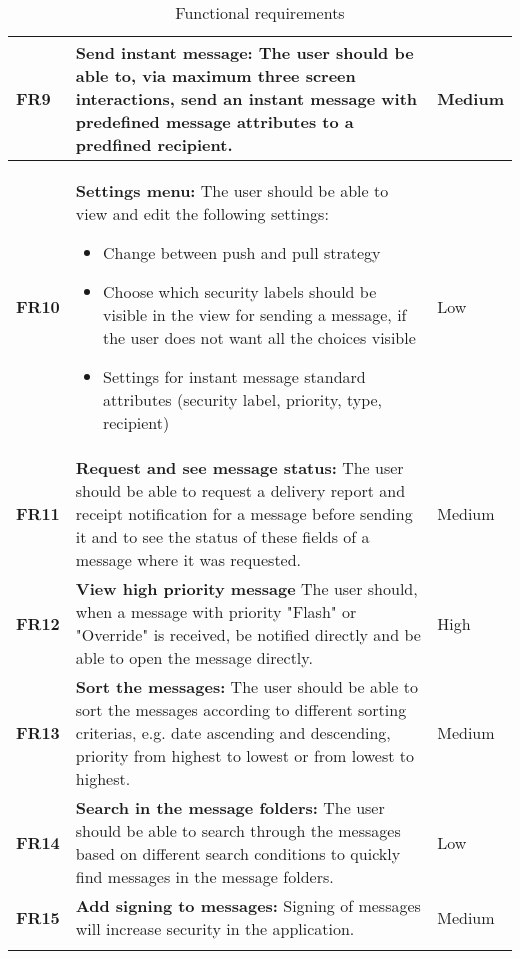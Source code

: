 \begin{longtable}{>{\setlength\hsize{.3\hsize}}X|>{\setlength\hsize{0.9\hsize}}X|>{\setlength\hsize{.3\hsize}}X}
\textbf{FR9} & \textbf{Send instant message:} The user should be able to, via maximum three screen interactions, send an instant message with predefined message attributes to a predfined recipient. & Medium \\ \hline

\textbf{FR10} & \textbf{Settings menu:} The user should be able to view and edit the following settings:
\begin{itemize}
\item{}Change between push and pull strategy
\item{}Choose which security labels should be visible in the view for sending a message, if the user does not want all the choices visible
\item{}Settings for instant message standard attributes (security label, priority, type, recipient)
\end{itemize}  & Low \\ \hline

\textbf{FR11} & \textbf{Request and see message status:} The user should be able to request a delivery report and receipt notification for a message before sending it and to see the status of these fields of a message where it was requested. & Medium \\ \hline

\textbf{FR12} & \textbf{View high priority message} The user should, when a message with priority "Flash" or "Override" is received, be notified directly and be able to open the message directly. & High \\ \hline

\textbf{FR13} & \textbf{Sort the messages:} The user should be able to sort the messages according to different sorting criterias, e.g. date ascending and descending, priority from highest to lowest or from lowest to highest. & Medium \\ \hline

\textbf{FR14} & \textbf{Search in the message folders:} The user should be able to search through the messages based on different search conditions to quickly find messages in the message folders. & Low \\ \hline

\textbf{FR15} & \textbf{Add signing to messages:} Signing of messages will increase security in the application. & Medium \\ \hline

\caption{Functional requirements} \label{tab:functionalrequirements}
\end{longtable}